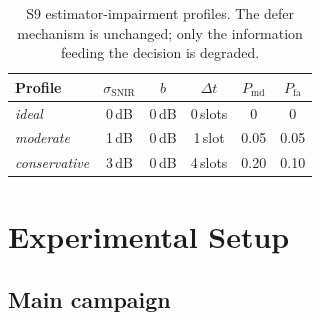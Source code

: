 \documentclass[journal,onecolumn,11pt,a4paper]{IEEEtran}
\newcommand{\snir}{\mathrm{SNIR}}
\begin{document}
\begin{table}[t]
  \centering
  \caption{S9 estimator-impairment profiles. The defer mechanism is
  unchanged; only the information feeding the decision is degraded.}
  \label{tab:profiles}
  \begin{tabular}{lccccc}
    \toprule
    Profile & $\sigma_{\snir}$ & $b$ & $\Delta t$ & $P_{\mathrm{md}}$ & $P_{\mathrm{fa}}$ \\
    \midrule
    \emph{ideal}        & 0\,dB & 0\,dB & 0\,slots & 0    & 0   \\
    \emph{moderate}     & 1\,dB & 0\,dB & 1\,slot  & 0.05 & 0.05\\
    \emph{conservative} & 3\,dB & 0\,dB & 4\,slots & 0.20 & 0.10\\
    \bottomrule
  \end{tabular}
\end{table}

\section{Experimental Setup}
\label{sec:setup}

\subsection{Main campaign}
\label{sec:setup-main}
\end{document}
